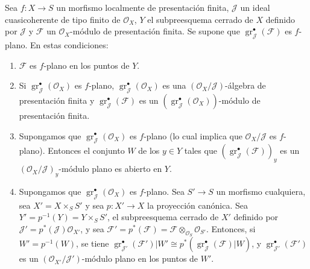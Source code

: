 \begin{proposition}[11.3.4]
\label{IV.11.3.4}
Sea $f:X\to S$ un morfismo localmente de presentación finita, $\mathcal J$ un ideal cuasicoherente de tipo finito de $\mathcal O_X$, $Y$ el subpreesquema cerrado de $X$ definido por $\mathcal J$ y $\mathcal F$ un $\mathcal O_X$-módulo de presentación finita. Se supone que $\operatorname{gr}_{\mathcal J}^\bullet(\mathcal F)$ es $f$-plano. En estas condiciones:
\begin{enumerate}[label=\emph{(\roman*)}]
  \item $\mathcal F$ es $f$-plano en los puntos de $Y$.
  \item Si $\operatorname{gr}_{\mathcal J}^\bullet(\mathcal O_X)$ es $f$-plano, $\operatorname{gr}_{\mathcal J}^\bullet(\mathcal O_X)$ es una $(\mathcal O_X/\mathcal J)$-álgebra de presentación finita y $\operatorname{gr}_{\mathcal J}^\bullet(\mathcal F)$ es un $(\operatorname{gr}_{\mathcal J}^\bullet(\mathcal O_X))$-módulo de presentación finita.
  \item Supongamos que $\operatorname{gr}_{\mathcal J}^\bullet(\mathcal O_X)$ es $f$-plano (lo cual implica que $\mathcal O_X/\mathcal J$ es $f$-plano). Entonces el conjunto $W$ de los $y\in Y$ tales que $(\operatorname{gr}_{\mathcal J}^\bullet(\mathcal F))_y$ es un $(\mathcal O_X/\mathcal J)_y$-módulo plano es abierto en $Y$.
  \item Supongamos que $\operatorname{gr}_{\mathcal J}^\bullet(\mathcal O_X)$ es $f$-plano. Sea $S'\to S$ un morfismo cualquiera, sea $X'=X\times_SS'$ y sea $p:X'\to X$ la proyección canónica. Sea $Y'=p^{-1}(Y)=Y\times_SS'$, el subpreesquema cerrado de $X'$ definido por $\mathcal J'=p^*(\mathcal J)\mathcal O_{X'}$, y sea $\mathcal F'=p^*(\mathcal F)
=\mathcal F\otimes_{\mathcal O_S}\mathcal O_{S'}$. Entonces, si $W'=p^{-1}(W)$, se tiene $\operatorname{gr}_{\mathcal J'}^\bullet(\mathcal F')|W'
\cong p^*(\operatorname{gr}_{\mathcal J}^\bullet(\mathcal F)|W)$, y $\operatorname{gr}_{\mathcal J'}^\bullet(\mathcal F')$ es un $(\mathcal O_{X'}/\mathcal J')$-módulo plano en los puntos de $W'$.
\end{enumerate}
\end{proposition}

